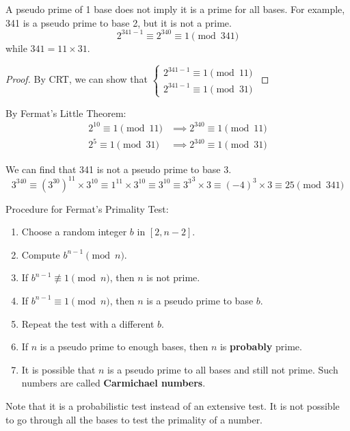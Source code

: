 \documentclass[letterpaper,12pt,oneside]{article}
\begin{document}
A pseudo prime of 1 base does not imply it is a prime for all bases. For example, 341 is a pseudo prime to base 2, but it is not a prime.\[
    2^{341-1}\equiv 2^{340}\equiv 1 \pmod {341}
\]
while $341=11\times 31$.

\begin{proof}
    By CRT, we can show that $\begin{cases}
        2^{341-1}\equiv 1 \pmod {11} \\
        2^{341-1}\equiv 1 \pmod {31}
    \end{cases}$
\end{proof}
By Fermat's Little Theorem:\begin{align*}
    2^{10}\equiv 1 \pmod {11} & \implies 2^{340}\equiv 1 \pmod {11} \\
    2^{5}\equiv 1 \pmod {31} & \implies 2^{340}\equiv 1 \pmod {31}
\end{align*}

We can find that 341 is not a pseudo prime to base 3.\[
    3^{340}\equiv (3^{30})^{11} \times 3^{10}\equiv 1^{11}\times 3^{10}\equiv 3^{10}\equiv {3^3}^3\times 3\equiv (-4)^3\times 3\equiv 25 \pmod {341}
\]

Procedure for Fermat's Primality Test:\begin{enumerate}
    \item Choose a random integer $b$ in $[2,n-2]$.
    \item Compute $b^{n-1}\pmod n$.
    \item If $b^{n-1}\not\equiv 1 \pmod n$, then $n$ is not prime.
    \item If $b^{n-1}\equiv 1 \pmod n$, then $n$ is a pseudo prime to base $b$.
    \item Repeat the test with a different $b$.
    \item If $n$ is a pseudo prime to enough bases, then $n$ is \textbf{probably} prime.
    \item It is possible that $n$ is a pseudo prime to all bases and still not prime. Such numbers are called \textbf{Carmichael numbers}.
\end{enumerate}
Note that it is a probabilistic test instead of an extensive test. It is not possible to go through all the bases to test the primality of a number.
\end{document}

